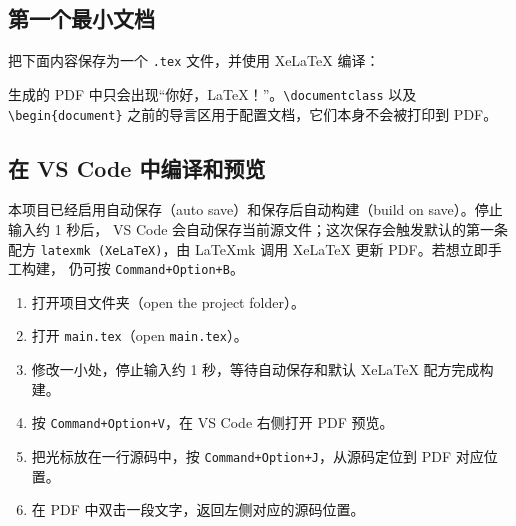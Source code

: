 \subsection{第一个最小文档}

把下面内容保存为一个 \texttt{.tex} 文件，并使用 XeLaTeX 编译：



\begin{resultbox}
\raggedright
生成的 PDF 中只会出现“你好，LaTeX！”。\texttt{\textbackslash documentclass} 以及
\texttt{\textbackslash begin\{document\}} 之前的导言区用于配置文档，它们本身不会被打印到 PDF。
\end{resultbox}

\subsection{在 VS Code 中编译和预览}

本项目已经启用自动保存（auto save）和保存后自动构建（build on save）。停止输入约 1 秒后，
VS Code 会自动保存当前源文件；这次保存会触发默认的第一条配方
\texttt{latexmk (XeLaTeX)}，由 LaTeXmk 调用 XeLaTeX 更新 PDF。若想立即手工构建，
仍可按 \texttt{Command+Option+B}。

\begin{enumerate}
    \item 打开项目文件夹（open the project folder）。
    \item 打开 \texttt{main.tex}（open \texttt{main.tex}）。
    \item 修改一小处，停止输入约 1 秒，等待自动保存和默认 XeLaTeX 配方完成构建。
    \item 按 \texttt{Command+Option+V}，在 VS Code 右侧打开 PDF 预览。
    \item 把光标放在一行源码中，按 \texttt{Command+Option+J}，从源码定位到 PDF 对应位置。
    \item 在 PDF 中双击一段文字，返回左侧对应的源码位置。
\end{enumerate}

